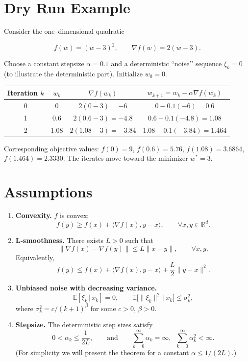 \documentclass{article}
\begin{document}
\section*{Dry Run Example}
Consider the one–dimensional quadratic  

\[
f(w)=(w-3)^{2},\qquad \nabla f(w)=2(w-3).
\]

Choose a constant stepsize $\alpha=0.1$ and a deterministic “noise’’ sequence
$\xi_k=0$ (to illustrate the deterministic part).  
Initialize $w_0=0$.

\begin{center}
\begin{tabular}{c|c|c|c}
Iteration $k$ & $w_k$ & $\nabla f(w_k)$ & $w_{k+1}=w_k-\alpha\nabla f(w_k)$ \\ \hline
0 & $0$ & $2(0-3)=-6$ & $0-0.1(-6)=0.6$ \\
1 & $0.6$ & $2(0.6-3)=-4.8$ & $0.6-0.1(-4.8)=1.08$ \\
2 & $1.08$ & $2(1.08-3)=-3.84$ & $1.08-0.1(-3.84)=1.464$ \\
\end{tabular}
\end{center}

Corresponding objective values: $f(0)=9$, $f(0.6)=5.76$, $f(1.08)=3.6864$, $f(1.464)=2.3330$.  
The iterates move toward the minimizer $w^{*}=3$.

\newpage

\section*{Assumptions}
\begin{enumerate}
    \item[(A1)] \textbf{Convexity.} $f$ is convex:
    \[
    f(y)\ge f(x)+\langle\nabla f(x),y-x\rangle,\qquad\forall x,y\in\mathbb{R}^{d}.
    \]
    \item[(A2)] \textbf{L‑smoothness.} There exists $L>0$ such that
    \[
    \|\nabla f(x)-\nabla f(y)\|\le L\|x-y\|,\qquad\forall x,y.
    \]
    Equivalently,
    \[
    f(y)\le f(x)+\langle\nabla f(x),y-x\rangle+\frac{L}{2}\|y-x\|^{2}.
    \]
    \item[(A3)] \textbf{Unbiased noise with decreasing variance.}
    \[
    \mathbb{E}[\xi_k\,|\,x_k]=0,\qquad 
    \mathbb{E}\big[\|\xi_k\|^{2}\,\big|\,x_k\big]\le\sigma_k^{2},
    \]
    where $\sigma_k^{2}=c/(k+1)^{\beta}$ for some $c>0$, $\beta>0$.
    \item[(A4)] \textbf{Stepsize.} The deterministic step sizes satisfy
    \[
    0<\alpha_k\le\frac{1}{2L},\qquad\text{and}\qquad 
    \sum_{k=0}^{\infty}\alpha_k =\infty,\;\;\sum_{k=0}^{\infty}\alpha_k^{2}<\infty .
    \]
    (For simplicity we will present the theorem for a constant $\alpha\le 1/(2L)$.)
\end{enumerate}
\end{document}
